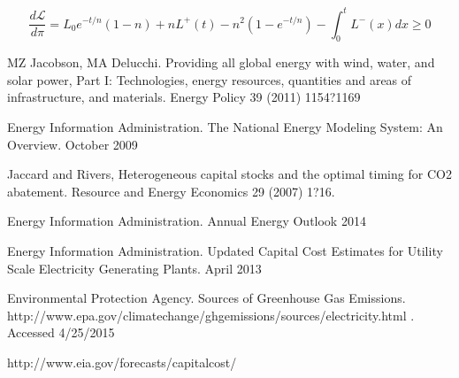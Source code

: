 \documentclass{article}
\newcommand{\Lagr}{\mathcal{L}}
\begin{document}
\begin{equation}\label{eq:dLdpi}
\frac{d\Lagr}{d\pi} = L_0 e^{-t/n}(1-n) + nL^+(t) - n^2(1-e^{-t/n}) - \int_0^t L^-(x)dx \geq 0 
\end{equation}












\pagebreak
{}

\begin{thebibliography}{99}

MZ Jacobson, MA Delucchi. Providing all global energy with wind, water, and solar power, Part I: Technologies, energy resources, quantities and areas of infrastructure, and materials. Energy Policy 39 (2011) 1154?1169

Energy Information Administration. The National Energy Modeling System: An Overview. October 2009

Jaccard and Rivers, Heterogeneous capital stocks and the optimal timing for CO2 abatement. Resource and Energy Economics 29 (2007) 1?16.

Energy Information Administration. Annual Energy Outlook 2014

Energy Information Administration. Updated Capital Cost Estimates for Utility Scale Electricity Generating Plants. April 2013


Environmental Protection Agency. Sources of Greenhouse Gas Emissions.  http://www.epa.gov/climatechange/ghgemissions/sources/electricity.html . Accessed 4/25/2015


http://www.eia.gov/forecasts/capitalcost/

\end{thebibliography}
\end{document}
